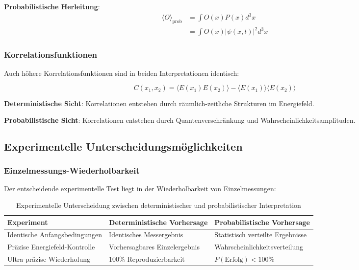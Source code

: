 \documentclass[12pt,a4paper]{article}
\theoremstyle{definition}
\theoremstyle{remark}
\begin{document}
\textbf{Probabilistische Herleitung}:
\begin{align}
	\langle O \rangle_{\text{prob}} &= \int O(x) P(x) d^3x \\
	&= \int O(x) |\psi(x,t)|^2 d^3x
\end{align}

\subsubsection{Korrelationsfunktionen}

Auch höhere Korrelationsfunktionen sind in beiden Interpretationen identisch:

\begin{equation}
	\boxed{C(x_1, x_2) = \langle E(x_1) E(x_2) \rangle - \langle E(x_1) \rangle \langle E(x_2) \rangle}
	\label{eq:correlation_equivalence}
\end{equation}

\textbf{Deterministische Sicht}: Korrelationen entstehen durch räumlich-zeitliche Strukturen im Energiefeld.

\textbf{Probabilistische Sicht}: Korrelationen entstehen durch Quantenverschränkung und Wahrscheinlichkeitsamplituden.

\subsection{Experimentelle Unterscheidungsmöglichkeiten}

\subsubsection{Einzelmessungs-Wiederholbarkeit}

Der entscheidende experimentelle Test liegt in der Wiederholbarkeit von Einzelmessungen:

\begin{table}[htbp]
	\centering
	\begin{tabular}{|p{5cm}|p{5cm}|p{5cm}|}
		\hline
		\textbf{Experiment} & \textbf{Deterministische Vorhersage} & \textbf{Probabilistische Vorhersage} \\
		\hline
		Identische Anfangsbedingungen & Identisches Messergebnis & Statistisch verteilte Ergebnisse \\
		\hline
		Präzise Energiefeld-Kontrolle & Vorhersagbares Einzelergebnis & Wahrscheinlichkeitsverteilung \\
		\hline
		Ultra-präzise Wiederholung & $100\%$ Reproduzierbarkeit & $P(\text{Erfolg}) < 100\%$ \\
		\hline
	\end{tabular}
	\caption{Experimentelle Unterscheidung zwischen deterministischer und probabilistischer Interpretation}
\end{table}
\end{document}
